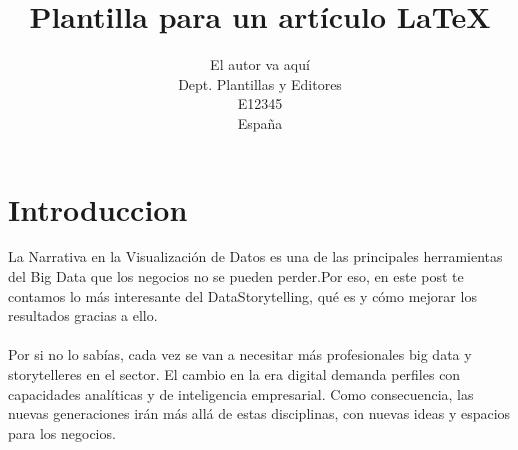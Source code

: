 %
%



\title{Plantilla para un artículo \LaTeX}
\author{El autor va aquí\\
  \small Dept. Plantillas y Editores\\
  \small E12345\\
  \small España
}



\section{Introduccion}
\item{La Narrativa en la Visualización de Datos es una de las principales herramientas del Big Data que los negocios no se pueden perder.Por eso, en este post te contamos lo más interesante del DataStorytelling, qué es y cómo mejorar los resultados gracias a ello.\\\\
Por si no lo sabías, cada vez se van a necesitar más profesionales big data y  storytelleres en el sector. El cambio en la era digital demanda perfiles con capacidades analíticas y de inteligencia empresarial. Como consecuencia, las nuevas generaciones irán más allá de estas disciplinas, con nuevas ideas y espacios para los negocios.}

